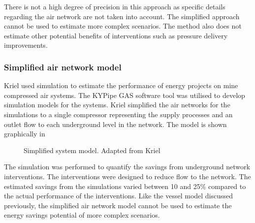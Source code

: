 		There is not a high degree of precision in this approach as specific details regarding the air network are not taken into account. The simplified approach cannot be used to estimate more complex scenarios. The method also does not estimate other potential benefits of interventions such as pressure delivery improvements.
		
		\subsubsection{Simplified air network model}
		Kriel \cite{Kriel2014Masters} used simulation to estimate the performance of energy projects on mine compressed air systems. The KYPipe GAS software tool was utilised to develop simulation models for the systems. Kriel simplified the air networks for the simulations to a single compressor representing the supply processes and an outlet flow to each underground level in the network. The model is shown graphically in 
		\begin{figure}[h!]
			\centering
			\caption[Simplified system model]{Simplified system model. Adapted from Kriel \cite{Kriel2014Masters}}
			\label{fig:kriel model}
		\end{figure}
		\par 
		The simulation was performed to quantify the savings from underground network interventions. The interventions were designed to reduce flow to the network. The estimated savings from the simulations varied between 10 and 25\% compared to the actual performance of the interventions. Like the vessel model discussed previously, the simplified air network model cannot be used to estimate the energy savings potential of more complex scenarios.
